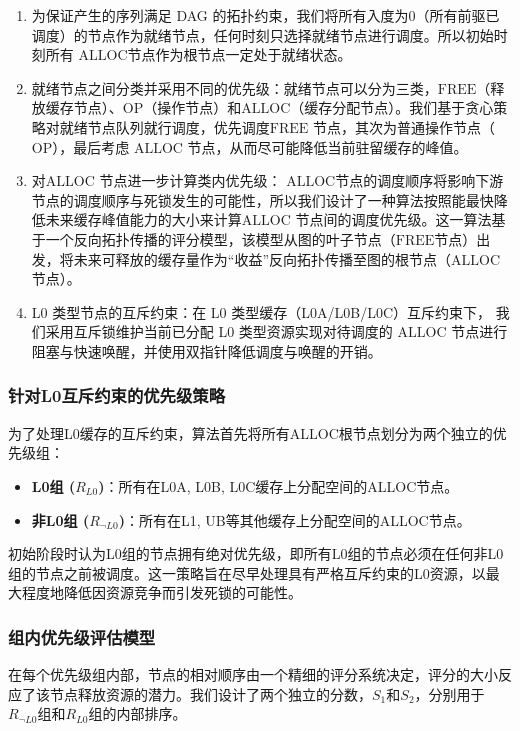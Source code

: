 \begin{enumerate}[noitemsep]
  \item 为保证产生的序列满足 DAG 的拓扑约束，我们将所有入度为0（所有前驱已调度）的节点作为就绪节点，任何时刻只选择就绪节点进行调度。所以初始时刻所有 \(\mathrm{ALLOC}\)节点作为根节点一定处于就绪状态。
  \item 就绪节点之间分类并采用不同的优先级：就绪节点可以分为三类，\(\mathrm{FREE}\)（释放缓存节点）、\(\mathrm{OP}\)（操作节点）和\(\mathrm{ALLOC}\)（缓存分配节点）。我们基于贪心策略对就绪节点队列就行调度，优先调度\(\mathrm{FREE}\) 节点，其次为普通操作节点（\(\mathrm{OP}\)），最后考虑 \(\mathrm{ALLOC}\) 节点，从而尽可能降低当前驻留缓存的峰值。
  \item 对\(\mathrm{ALLOC}\) 节点进一步计算类内优先级：
  \(\mathrm{ALLOC}\)节点的调度顺序将影响下游节点的调度顺序与死锁发生的可能性，所以我们设计了一种算法按照能最快降低未来缓存峰值能力的大小来计算\(\mathrm{ALLOC}\) 节点间的调度优先级。这一算法基于一个反向拓扑传播的评分模型，该模型从图的叶子节点（\(\mathrm{FREE}\)节点）出发，将未来可释放的缓存量作为“收益”反向拓扑传播至图的根节点（\(\mathrm{ALLOC}\) 节点）。
  \item L0 类型节点的互斥约束：在 L0 类型缓存（L0A/L0B/L0C）互斥约束下， 我们采用互斥锁维护当前已分配 L0 类型资源实现对待调度的 \(\mathrm{ALLOC}\) 节点进行阻塞与快速唤醒，并使用双指针降低调度与唤醒的开销。
\end{enumerate}

\subsubsection{针对L0互斥约束的优先级策略}
为了处理L0缓存的互斥约束，算法首先将所有ALLOC根节点划分为两个独立的优先级组：
\begin{itemize}[noitemsep]
    \item \textbf{L0组 ($R_{L0}$)}：所有在L0A, L0B, L0C缓存上分配空间的ALLOC节点。
    \item \textbf{非L0组 ($R_{\neg L0}$)}：所有在L1, UB等其他缓存上分配空间的ALLOC节点。
\end{itemize}
初始阶段时认为L0组的节点拥有绝对优先级，即所有L0组的节点必须在任何非L0组的节点之前被调度。这一策略旨在尽早处理具有严格互斥约束的L0资源，以最大程度地降低因资源竞争而引发死锁的可能性。

\subsubsection{组内优先级评估模型}
在每个优先级组内部，节点的相对顺序由一个精细的评分系统决定，评分的大小反应了该节点释放资源的潜力。我们设计了两个独立的分数，$S_1$和$S_2$，分别用于$R_{\neg L0}$组和$R_{L0}$组的内部排序。

